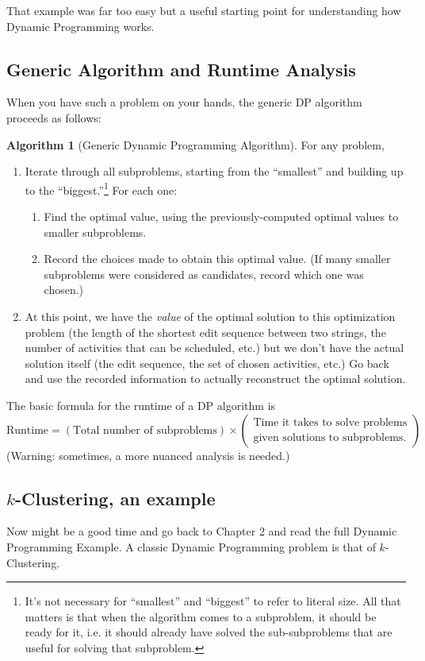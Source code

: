 \documentclass[11pt]{article}
\theoremstyle{plain}
\theoremstyle{definition}
\newtheorem{alg}[thm]{Algorithm}
\numberwithin{equation}{section}
\numberwithin{figure}{section}
\begin{document}
\noindent That example was far too easy but a useful starting point for understanding how Dynamic Programming works. 

\subsection{Generic Algorithm and Runtime Analysis}
When you have such a problem on your hands, the generic DP algorithm proceeds as follows:
\begin{alg}[Generic Dynamic Programming Algorithm]
For any problem,
\begin{enumerate}
\item Iterate through all subproblems, starting from the ``smallest'' and building up to the ``biggest.''\footnote{It's not necessary for ``smallest'' and ``biggest'' to refer to literal size. All that matters is that when the algorithm comes to a subproblem, it should be ready for it, i.e. it should already have solved the sub-subproblems that are useful for solving that subproblem.
} For each one:
\begin{enumerate}
\item Find the optimal value, using the previously-computed optimal values to smaller subproblems.
\item Record the choices made to obtain this optimal value. (If many smaller subproblems were considered as candidates, record which one was chosen.)
\end{enumerate}
\item At this point, we have the \emph{value} of the optimal solution to this optimization problem (the length of the shortest edit sequence between two strings, the number of activities that can be scheduled, etc.) but we don't have the actual solution itself (the edit sequence, the set of chosen activities, etc.) Go back and use the recorded information to actually reconstruct the optimal solution.
\end{enumerate}
\end{alg}

\noindent The basic formula for the runtime of a DP algorithm is
\[
\text{Runtime} = (\text{Total number of subproblems}) \times \left(\begin{array}{c}\text{Time it takes to solve problems} \\ \text{given solutions to subproblems.}\end{array}\right)
\]
(Warning: sometimes, a more nuanced analysis is needed.)

\subsection{$k$-Clustering, an example}
Now might be a good time and go back to Chapter 2 and read the full Dynamic Programming Example. A classic Dynamic Programming problem is that of $k$-Clustering.
\end{document}
